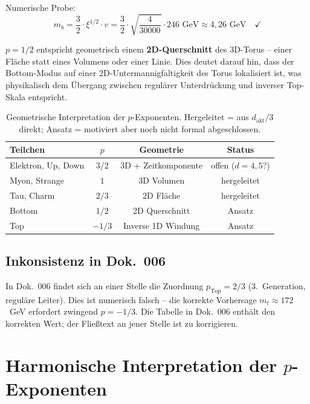 Numerische Probe:
\begin{equation}
    m_b = \frac{3}{2} \cdot \xi^{1/2} \cdot v
    = \frac{3}{2} \cdot \sqrt{\frac{4}{30000}} \cdot 246 \text{ GeV}
    \approx 4{,}26 \text{ GeV} \quad \checkmark
\end{equation}

$p = 1/2$ entspricht geometrisch einem \textbf{2D-Querschnitt} des
3D-Torus -- einer Fläche statt eines Volumens oder einer Linie.
Dies deutet darauf hin, dass der Bottom-Modus auf einer 2D-Untermannigfaltigkeit
des Torus lokalisiert ist, was physikalisch dem Übergang zwischen
regulärer Unterdrückung und inverser Top-Skala entspricht.

\begin{table}[htbp]
\centering\small
\begin{tabular}{lccc}
\toprule
\textbf{Teilchen} & $p$ & \textbf{Geometrie} & \textbf{Status} \\
\midrule
Elektron, Up, Down & $3/2$ & 3D + Zeit\-komponente & offen ($d=4{,}5$?) \\
Myon, Strange      & $1$   & 3D Volumen          & hergeleitet \\
Tau, Charm         & $2/3$ & 2D Fläche           & hergeleitet \\
Bottom             & $1/2$ & 2D Querschnitt      & Ansatz \\
Top                & $-1/3$& Inverse 1D Windung  & Ansatz \\
\bottomrule
\end{tabular}
\caption{Geometrische Interpretation der $p$-Exponenten.
Hergeleitet = aus $d_{\text{akt}}/3$ direkt; Ansatz = motiviert
aber noch nicht formal abgeschlossen.}
\label{tab:p_geometrie}
\end{table}

\subsection{Inkonsistenz in Dok.~006}

In Dok.~006 findet sich an einer Stelle die Zuordnung
$p_{\text{Top}} = 2/3$ (3.~Generation, reguläre Leiter). Dies
ist numerisch falsch -- die korrekte Vorhersage $m_t \approx 172$~GeV
erfordert zwingend $p = -1/3$. Die Tabelle in Dok.~006 enthält den
korrekten Wert; der Fließtext an jener Stelle ist zu korrigieren.

\section{Harmonische Interpretation der \texorpdfstring{$p$}{p}-Exponenten}

